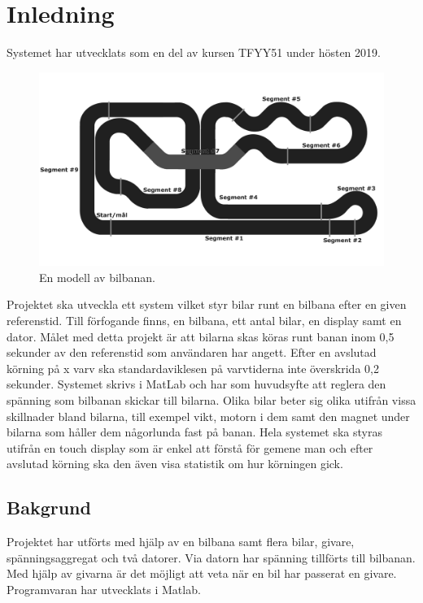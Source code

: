 \section{Inledning}
Systemet har utvecklats som en del av kursen TFYY51 under hösten 2019.  

\begin{figure}
	\centering
	\includegraphics[width=\linewidth] {Figures/BanaModell}
	\caption{En modell av bilbanan.}
	\label{fig:bilbanan}
\end{figure}

Projektet ska utveckla ett system vilket styr bilar runt en bilbana efter en
given referenstid. Till förfogande finns, en bilbana, ett antal bilar, en
display samt en dator.  Målet med detta projekt är att bilarna skas köras runt
banan inom 0,5 sekunder av den referenstid som användaren har angett. Efter en
avslutad körning på x varv ska standardaviklesen på varvtiderna inte överskrida
0,2 sekunder. Systemet skrivs i MatLab och har som huvudsyfte att reglera den
spänning som bilbanan skickar till bilarna. Olika bilar beter sig olika utifrån
vissa skillnader bland bilarna, till exempel vikt, motorn i dem samt den magnet
under bilarna som håller dem någorlunda fast på banan.  Hela systemet ska styras
utifrån en touch display som är enkel att förstå för gemene man och efter
avslutad körning ska den även visa statistik om hur körningen gick. 

\subsection{Bakgrund} 

Projektet har utförts med hjälp av en bilbana samt flera bilar, givare,
spänningsaggregat och två datorer. Via datorn har spänning
tillförts till bilbanan. Med hjälp av givarna är det möjligt att veta när en bil
har passerat en givare. Programvaran har utvecklats i Matlab.

